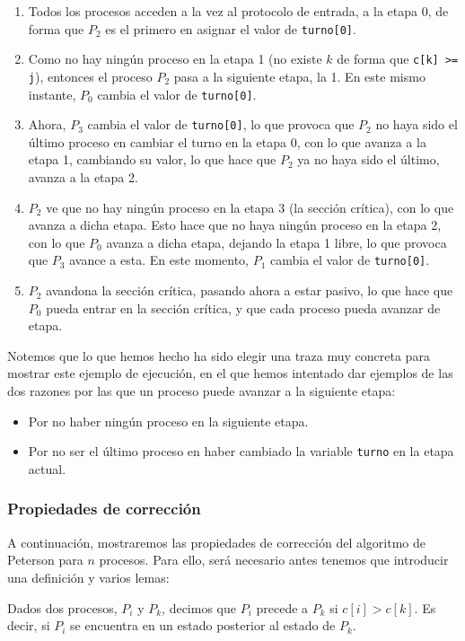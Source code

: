 \begin{ejemplo}
\begin{enumerate}[label=(\arabic*), start=0]
        \item Todos los procesos acceden a la vez al protocolo de entrada, a la etapa 0, de forma que $P_2$ es el primero en asignar el valor de \verb|turno[0]|.
        \item Como no hay ningún proceso en la etapa 1 (no existe $k$ de forma que \verb|c[k] >= j|), entonces el proceso $P_2$ pasa a la siguiente etapa, la 1. En este mismo instante, $P_0$ cambia el valor de \verb|turno[0]|.
        \item Ahora, $P_3$ cambia el valor de \verb|turno[0]|, lo que provoca que $P_2$ no haya sido el último proceso en cambiar el turno en la etapa 0, con lo que avanza a la etapa 1, cambiando su valor, lo que hace que $P_2$ ya no haya sido el último, avanza a la etapa 2.
        \item $P_2$ ve que no hay ningún proceso en la etapa 3 (la sección crítica), con lo que avanza a dicha etapa. Esto hace que no haya ningún proceso en la etapa 2, con lo que $P_0$ avanza a dicha etapa, dejando la etapa 1 libre, lo que provoca que $P_3$ avance a esta. En este momento, $P_1$ cambia el valor de \verb|turno[0]|.
        \item $P_2$ avandona la sección crítica, pasando ahora a estar pasivo, lo que hace que $P_0$ pueda entrar en la sección crítica, y que cada proceso pueda avanzar de etapa.
    \end{enumerate}
    Notemos que lo que hemos hecho ha sido elegir una traza muy concreta para mostrar este ejemplo de ejecución, en el que hemos intentado dar ejemplos de las dos razones por las que un proceso puede avanzar a la siguiente etapa:
    \begin{itemize}
        \item Por no haber ningún proceso en la siguiente etapa.
        \item Por no ser el último proceso en haber cambiado la variable \verb|turno| en la etapa actual.
    \end{itemize}
\end{ejemplo}

\subsubsection{Propiedades de corrección}
A continuación, mostraremos las propiedades de corrección del algoritmo de Peterson para $n$ procesos. Para ello, será necesario antes tenemos que introducir una definición y varios lemas:

\begin{definicion}[Precedencia]
    Dados dos procesos, $P_i$ y $P_k$, decimos que $P_i$ precede a $P_k$ si $c[i] > c[k]$. Es decir, si $P_i$ se encuentra en un estado posterior al estado de $P_k$.
\end{definicion}

